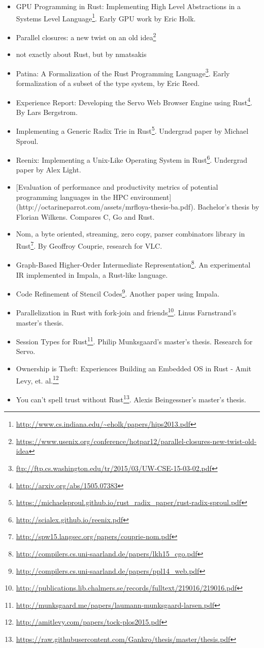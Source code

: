 \documentclass[a4paper,]{book}
\renewcommand{\href}[2]{#2\footnote{\url{#1}}}
\providecommand{\tightlist}{%
  \setlength{\itemsep}{0pt}\setlength{\parskip}{0pt}}
\begin{document}
\begin{itemize}
\tightlist
\item
  \href{http://www.cs.indiana.edu/~eholk/papers/hips2013.pdf}{GPU
  Programming in Rust: Implementing High Level Abstractions in a Systems
  Level Language}. Early GPU work by Eric Holk.
\item
  \href{https://www.usenix.org/conference/hotpar12/parallel-closures-new-twist-old-idea}{Parallel
  closures: a new twist on an old idea}
\item
  not exactly about Rust, but by nmatsakis
\item
  \href{ftp://ftp.cs.washington.edu/tr/2015/03/UW-CSE-15-03-02.pdf}{Patina:
  A Formalization of the Rust Programming Language}. Early formalization
  of a subset of the type system, by Eric Reed.
\item
  \href{http://arxiv.org/abs/1505.07383}{Experience Report: Developing
  the Servo Web Browser Engine using Rust}. By Lars Bergstrom.
\item
  \href{https://michaelsproul.github.io/rust_radix_paper/rust-radix-sproul.pdf}{Implementing
  a Generic Radix Trie in Rust}. Undergrad paper by Michael Sproul.
\item
  \href{http://scialex.github.io/reenix.pdf}{Reenix: Implementing a
  Unix-Like Operating System in Rust}. Undergrad paper by Alex Light.
\item
  {[}Evaluation of performance and productivity metrics of potential
  programming languages in the HPC environment{]}
  (http://octarineparrot.com/assets/mrfloya-thesis-ba.pdf). Bachelor's
  thesis by Florian Wilkens. Compares C, Go and Rust.
\item
  \href{http://spw15.langsec.org/papers/couprie-nom.pdf}{Nom, a byte
  oriented, streaming, zero copy, parser combinators library in Rust}.
  By Geoffroy Couprie, research for VLC.
\item
  \href{http://compilers.cs.uni-saarland.de/papers/lkh15_cgo.pdf}{Graph-Based
  Higher-Order Intermediate Representation}. An experimental IR
  implemented in Impala, a Rust-like language.
\item
  \href{http://compilers.cs.uni-saarland.de/papers/ppl14_web.pdf}{Code
  Refinement of Stencil Codes}. Another paper using Impala.
\item
  \href{http://publications.lib.chalmers.se/records/fulltext/219016/219016.pdf}{Parallelization
  in Rust with fork-join and friends}. Linus Farnstrand's master's
  thesis.
\item
  \href{http://munksgaard.me/papers/laumann-munksgaard-larsen.pdf}{Session
  Types for Rust}. Philip Munksgaard's master's thesis. Research for
  Servo.
\item
  \href{http://amitlevy.com/papers/tock-plos2015.pdf}{Ownership is
  Theft: Experiences Building an Embedded OS in Rust - Amit Levy, et.
  al.}
\item
  \href{https://raw.githubusercontent.com/Gankro/thesis/master/thesis.pdf}{You
  can't spell trust without Rust}. Alexis Beingessner's master's thesis.
\end{itemize}
\end{document}
